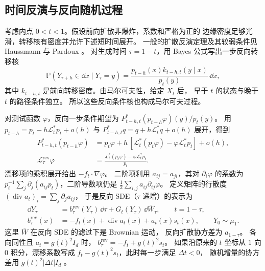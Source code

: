 \subsection{时间反演与反向随机过程}
\label{subsec:foundations-time-reversal}

考虑内点 \(0<t<1\)。假设前向扩散非爆炸，系数和严格为正的
边缘密度足够光滑，转移核有密度并允许下述短时间展开。
一般的扩散反演定理及其较弱条件见 Haussmann 与 Pardoux
\cite[定理~2.1]{haussmann1986time}。
对生成时间 \(\tau=1-t\)，用 Bayes 公式写出一步反向转移核
\begin{equation}
  \mathbb P(Y_{\tau+h}\in\dd x\mid Y_\tau=y)
    = \frac{p_{t-h}(x)k_{t-h,t}(y\mid x)}{p_t(y)}\,\dd x ,
  \label{eq:foundations-reverse-kernel}
\end{equation}
其中 \(k_{t-h,t}\) 是前向转移密度。由马尔可夫性，给定 \(X_t\) 后，
早于 \(t\) 的状态与晚于 \(t\) 的路径条件独立。
所以这些反向条件核也构成马尔可夫过程。

对测试函数 \(\varphi\)，反向一步条件期望为
\(P_{t-h,t}^*(p_{t-h}\varphi)(y)/p_t(y)\)。
用 \(p_{t-h}=p_t-h\mathcal L_t^*p_t+o(h)\) 与
\(P_{t-h,t}^*q=q+h\mathcal L_t^*q+o(h)\) 展开，得到
\begin{align*}
  P_{t-h,t}^*(p_{t-h}\varphi)
    &=p_t\varphi
      +h\,[\mathcal L_t^*(p_t\varphi)-\varphi\mathcal L_t^*p_t]+o(h),\\
  \mathcal L_\tau^{\mathrm{rev}}\varphi
    &=\frac{\mathcal L_t^*(p_t\varphi)-\varphi\mathcal L_t^*p_t}{p_t}.
\end{align*}
漂移项的乘积展开给出 \(-f_t\cdot\nabla\varphi\)。
二阶项利用 \(a_{ij}=a_{ji}\)，其对 \(\partial_i\varphi\) 的系数为
\(p_t^{-1}\sum_j\partial_j(a_{ij}p_t)\)，二阶导数项仍是
\(\tfrac12\sum_{i,j}a_{ij}\partial_{ij}\varphi\)。
定义矩阵的行散度 \((\operatorname{div}a_t)_i=\sum_j\partial_ja_{ij}\)，
于是反向 SDE（\(\tau\) 递增）的表示为
\begin{equation}
  \begin{aligned}
    \dd Y_\tau
      &=b_\tau^{\mathrm{rev}}(Y_\tau)\,\dd\tau
          +G_t(Y_\tau)\,\dd\overline W_\tau, \qquad t=1-\tau,\\
    b_\tau^{\mathrm{rev}}(x)
      &=-f_t(x)+\operatorname{div}a_t(x)+a_t(x)s_t(x),
         \qquad Y_0\sim\mu_1 .
  \end{aligned}
  \label{eq:foundations-reverse-sde}
\end{equation}
这里 \(\overline W\) 在反向 SDE 的滤过下是 Brownian 运动，
反向扩散协方差为 \(a_{1-\tau}\)。
各向同性且 \(a_t=g(t)^2I_d\) 时，
\(b_\tau^{\mathrm{rev}}=-f_t+g(t)^2s_t\)。
如果沿原来的 \(t\) 坐标从 \(1\) 向 \(0\) 积分，漂移系数写成
\(f_t-g(t)^2s_t\)，此时每一步满足 \(\Delta t<0\)，
随机增量的协方差用 \(g(t)^2|\Delta t|I_d\) \cite{song2021sde}。

